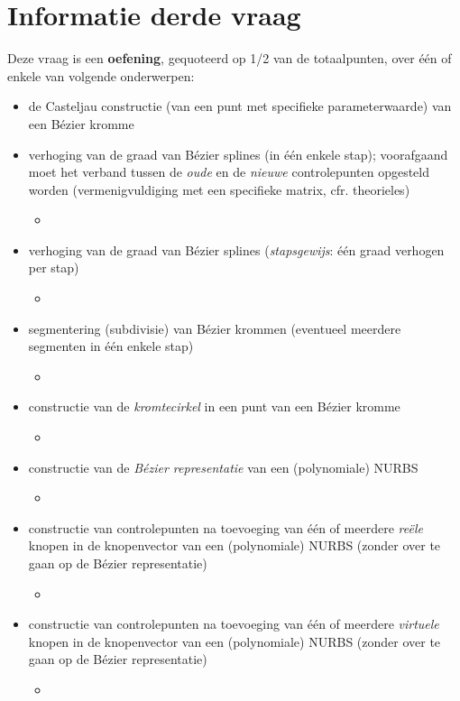 \documentclass{report}
\newcommand{\vraag}[2]{
	\item #1
	
	#2
}
\begin{document}
	\chapter{Informatie derde vraag}
	Deze vraag is een \textbf{oefening}, gequoteerd op 1/2 van de totaalpunten, over één of enkele van volgende onderwerpen:
	\begin{itemize}
		\vraag{ de Casteljau constructie (van een punt met specifieke parameterwaarde) van een Bézier kromme}{ 	}
		\vraag{ verhoging van de graad van Bézier splines (in één enkele stap); voorafgaand moet het verband tussen de \textit{oude} en de \textit{nieuwe} controlepunten opgesteld worden (vermenigvuldiging met een specifieke matrix, cfr. theorieles)}{\begin{itemize} \item {} \end{itemize}}
		\vraag{ verhoging van de graad van Bézier splines (\textit{stapsgewijs}: één graad verhogen per stap)}{\begin{itemize} \item {} \end{itemize}}
		\vraag{ segmentering (subdivisie) van Bézier krommen (eventueel meerdere segmenten in één enkele stap)}{\begin{itemize} \item {} \end{itemize}}
		\vraag{ constructie van de \textit{kromtecirkel} in een punt van een Bézier kromme}{\begin{itemize} \item {} \end{itemize}}
		\vraag{ constructie van de \textit{Bézier representatie} van een (polynomiale) NURBS}{\begin{itemize} \item {} \end{itemize}}
		\vraag{ constructie van controlepunten na toevoeging van één of meerdere \textit{reële} knopen in de knopenvector van een (polynomiale) NURBS (zonder over te gaan op de Bézier representatie)}{\begin{itemize} \item {} \end{itemize}}
		\vraag{ constructie van controlepunten na toevoeging van één of meerdere \textit{virtuele} knopen in de knopenvector van een (polynomiale) NURBS (zonder over te gaan op de Bézier representatie)}{\begin{itemize} \item \todo{oplossen} \end{itemize}}

\end{itemize}
\end{document}
